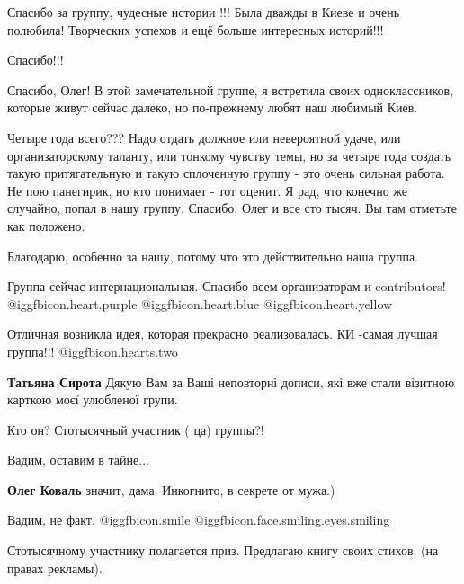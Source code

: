 \begin{itemize}
Спасибо за группу, чудесные истории !!! Была дважды в Киеве и очень полюбила!
Творческих успехов и ещё больше интересных историй!!!

Спасибо!!!


Спасибо, Олег! В этой замечательной группе, я встретила своих одноклассников,
которые живут сейчас далеко, но по-прежнему любят наш любимый Киев.


Четыре года всего??? Надо отдать должное или невероятной удаче, или
организаторскому таланту, или тонкому чувству темы, но за четыре года создать
такую притягательную и такую сплоченную группу - это очень сильная работа. Не
пою панегирик, но кто понимает - тот оценит. Я рад, что конечно же случайно,
попал в нашу группу. Спасибо, Олег и все сто тысяч. Вы там отметьте как
положено.

\begin{itemize} %
Благодарю, особенно за нашу, потому что это действительно наша группа.
\end{itemize} %

Группа сейчас интернациональная. Спасибо всем организаторам и contributors!  @igg{fbicon.heart.purple}  @igg{fbicon.heart.blue}  @igg{fbicon.heart.yellow} 


Отличная возникла идея, которая прекрасно реализовалась.
КИ -самая лучшая группа!!! @igg{fbicon.hearts.two} 

\begin{itemize} %
\textbf{Татьяна Сирота} Дякую Вам за Ваші неповторні дописи, які вже стали візитною карткою моєї улюбленої групи.
\end{itemize} %

Кто он? Стотысячный участник ( ца) группы?!

\begin{itemize} %
Вадим, оставим в тайне...

\textbf{Олег Коваль} значит, дама. Инкогнито, в секрете от мужа.)

Вадим, не факт.  @igg{fbicon.smile}  @igg{fbicon.face.smiling.eyes.smiling} 

Стотысячному участнику полагается приз. Предлагаю книгу своих стихов. (на правах рекламы).
\end{itemize} %


\end{itemize}
